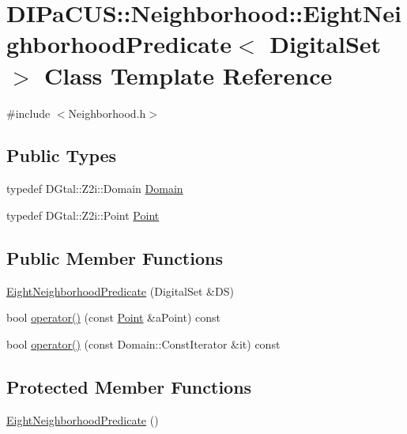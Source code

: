 \hypertarget{classDIPaCUS_1_1Neighborhood_1_1EightNeighborhoodPredicate}{}\section{D\+I\+Pa\+C\+US\+:\+:Neighborhood\+:\+:Eight\+Neighborhood\+Predicate$<$ Digital\+Set $>$ Class Template Reference}
\label{classDIPaCUS_1_1Neighborhood_1_1EightNeighborhoodPredicate}


{\ttfamily \#include $<$Neighborhood.\+h$>$}

\subsection*{Public Types}
\begin{DoxyCompactItemize}
\item 
typedef D\+Gtal\+::\+Z2i\+::\+Domain \mbox{\hyperlink{classDIPaCUS_1_1Neighborhood_1_1EightNeighborhoodPredicate_accd4ba38b8e605d949206135f0a3de61}{Domain}}
\item 
typedef D\+Gtal\+::\+Z2i\+::\+Point \mbox{\hyperlink{classDIPaCUS_1_1Neighborhood_1_1EightNeighborhoodPredicate_afd5b888b29042dd8ea3da17b3c3ee8cb}{Point}}
\end{DoxyCompactItemize}
\subsection*{Public Member Functions}
\begin{DoxyCompactItemize}
\item 
\mbox{\hyperlink{classDIPaCUS_1_1Neighborhood_1_1EightNeighborhoodPredicate_a587081fadcd1e6d5849a680da29f11bf}{Eight\+Neighborhood\+Predicate}} (Digital\+Set \&DS)
\item 
bool \mbox{\hyperlink{classDIPaCUS_1_1Neighborhood_1_1EightNeighborhoodPredicate_a2c7c5993b526beaf4c59b562f90adef9}{operator()}} (const \mbox{\hyperlink{classDIPaCUS_1_1Neighborhood_1_1EightNeighborhoodPredicate_afd5b888b29042dd8ea3da17b3c3ee8cb}{Point}} \&a\+Point) const
\item 
bool \mbox{\hyperlink{classDIPaCUS_1_1Neighborhood_1_1EightNeighborhoodPredicate_a9e407707448fa98dd91acffd4cebd9be}{operator()}} (const Domain\+::\+Const\+Iterator \&it) const
\end{DoxyCompactItemize}
\subsection*{Protected Member Functions}
\begin{DoxyCompactItemize}
\item 
\mbox{\hyperlink{classDIPaCUS_1_1Neighborhood_1_1EightNeighborhoodPredicate_ac854d645c83febba06718ef4a1091fc7}{Eight\+Neighborhood\+Predicate}} ()
\end{DoxyCompactItemize}


